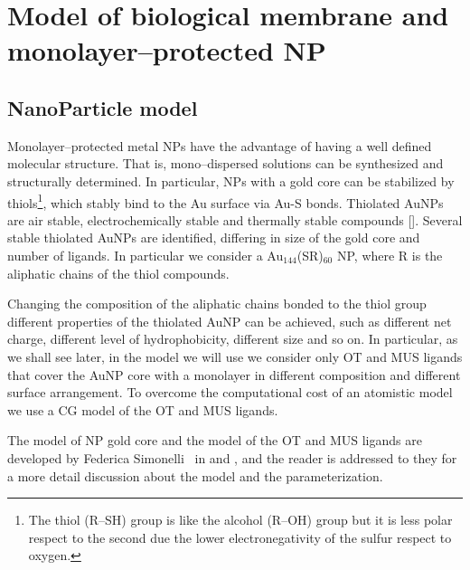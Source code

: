 \chapter{Model of biological membrane and monolayer--protected NP}

\section{NanoParticle model}
Monolayer--protected metal \acp{NP} have the advantage of having a well defined molecular structure. That is, mono--dispersed solutions can be synthesized and structurally determined. In particular, \acp{NP} with a gold core can be stabilized by thiols\footnote{The thiol (R--SH) group is like the alcohol (R--OH) group but it is less polar respect to the second due the lower electronegativity of the sulfur respect to oxygen.}, which stably bind to the Au surface via Au-S bonds. Thiolated Au\acp{NP} are air stable, electrochemically stable and thermally stable compounds []. Several stable thiolated Au\acp{NP} are identified, differing in size of the gold core and number of ligands. In particular we consider a {Au$_{144}$(SR)$_{60}$} \ac{NP}, where R is the aliphatic chains of the thiol compounds. 

Changing the composition of the aliphatic chains bonded to the thiol group different properties of the thiolated Au\ac{NP} can be achieved, such as different net charge, different level of hydrophobicity, different size and so on. In particular, as we shall see later, in the model we will use we consider only \ac{OT} and \ac{MUS} ligands that cover the Au\ac{NP} core with a monolayer in different composition and different surface arrangement. To overcome the computational cost of an atomistic model we use a \martini \ac{CG} model of the \ac{OT} and \ac{MUS} ligands. 

The model of \ac{NP} gold core and the \martini model of the \ac{OT} and \ac{MUS} ligands are developed by Federica Simonelli \etal\, in \cite{ourPaper} and \cite{simonelliThesis}, and the reader is addressed to they for a more detail discussion about the model and the parameterization.


